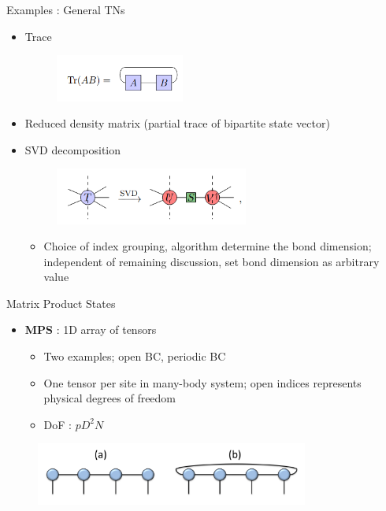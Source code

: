 \documentclass{beamer}
\begin{document}
\begin{frame}{Examples : General TNs}
	\begin{itemize}
	\item Trace 
		\begin{figure}[h]
		\includegraphics[width=0.4\textwidth]{trace}
		\centering
		\end{figure}
		
	\item Reduced density matrix (partial trace of bipartite state vector)
	\item SVD decomposition
		\begin{figure}[h]
		\includegraphics[width=0.6\textwidth]{svd}
		\centering
		\end{figure}
		\begin{itemize}
		\item Choice of index grouping, algorithm determine the bond dimension; independent of remaining discussion, set bond dimension as arbitrary value
		\end{itemize}
		
	\end{itemize}
\end{frame}

\begin{frame}{Matrix Product States}
	\begin{itemize}
		\item \textbf{MPS} : 1D array of tensors
		\begin{itemize}
		\item Two examples; open BC, periodic BC
		\item One tensor per site in many-body system; open indices represents physical degrees of freedom
		\item DoF : ${ pD^2N }$
		\end{itemize}
	\end{itemize}
	\begin{figure}[h]
	\includegraphics[width=0.8\textwidth]{mps}
	\centering
	\end{figure}
	
\end{frame}
\end{document}
